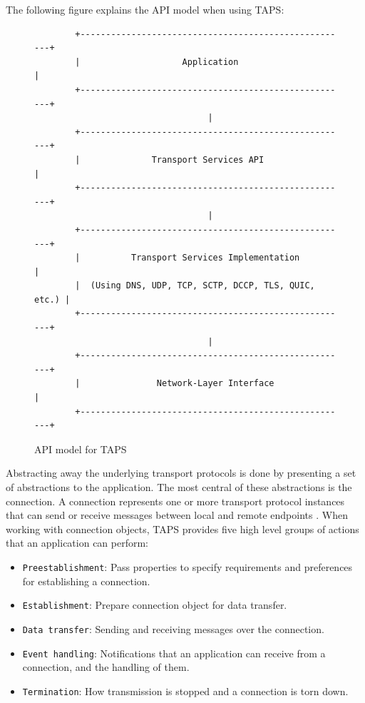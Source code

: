 The following figure explains the API model when using TAPS:

\begin{figure}[H]
    \centering
    \begin{lstlisting}
        +-----------------------------------------------------+
        |                    Application                      |
        +-----------------------------------------------------+
                                  |
        +-----------------------------------------------------+
        |              Transport Services API                 |
        +-----------------------------------------------------+
                                  |
        +-----------------------------------------------------+
        |          Transport Services Implementation          |
        |  (Using DNS, UDP, TCP, SCTP, DCCP, TLS, QUIC, etc.) |
        +-----------------------------------------------------+
                                  |
        +-----------------------------------------------------+
        |               Network-Layer Interface               |
        +-----------------------------------------------------+
    \end{lstlisting}
    \caption{API model for TAPS \cite{trammellAbstractApplicationProgramming2025}}
\end{figure}

Abstracting away the underlying transport protocols is done by
presenting a set of abstractions to the application. The most
central of these abstractions is the connection. A connection
represents one or more transport protocol instances that can
send or receive messages between local and remote endpoints 
\cite{trammellAbstractApplicationProgramming2025}.
When working with connection objects, TAPS provides five high
level groups of actions that an application can perform:
\begin{itemize}
    \item \texttt{Preestablishment}: Pass properties to specify
        requirements and preferences for establishing a connection.
    \item \texttt{Establishment}: Prepare connection object for data
        transfer.
    \item \texttt{Data transfer}: Sending and receiving messages
        over the connection.
    \item \texttt{Event handling}: Notifications that an application
        can receive from a connection, and the handling of them.
    \item \texttt{Termination}: How transmission is stopped and
        a connection is torn down.
\end{itemize}

